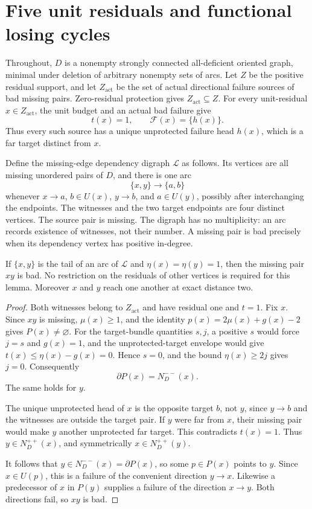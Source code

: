 \section{Five unit residuals and functional losing cycles}
\label{sec:five-unit-residuals}

Throughout, $D$ is a nonempty strongly connected all-deficient oriented
graph, minimal under deletion of arbitrary nonempty sets of arcs.
Let $Z$ be the positive residual support, and let $Z_{\mathrm{act}}$
be the set of actual directional
failure sources of bad missing pairs. Zero-residual protection gives
$Z_{\mathrm{act}}\subseteq Z$.
For every unit-residual $x\in Z_{\mathrm{act}}$, the unit budget and an actual bad
failure give
\[
 t(x)=1,\qquad\mathcal F(x)=\{h(x)\}.
\]
Thus every such source has a unique unprotected failure head $h(x)$,
which is a far target distinct from $x$.

Define the missing-edge dependency digraph $\mathcal L$ as follows.
Its vertices are all missing unordered pairs of $D$, and there is
one arc
\[
 \{x,y\}\longrightarrow\{a,b\}
\]
whenever $x\to a$, $b\in U(x)$, $y\to b$, and $a\in U(y)$,
possibly after interchanging the endpoints. The witnesses and the
two target endpoints are four distinct vertices. The source pair
is missing. The digraph has no multiplicity: an arc records existence
of witnesses, not their number. A missing pair is bad precisely when
its dependency vertex has positive in-degree.

\begin{lemma}
\label{lem:unit-cross-pairs-bad}
If $\{x,y\}$ is the tail of an arc of $\mathcal L$ and
$\eta(x)=\eta(y)=1$, then the missing pair $xy$ is bad.
No restriction on the residuals of other vertices is required for
this lemma. Moreover $x$ and $y$ reach one another at exact
distance two.
\end{lemma}

\begin{proof}
Both witnesses belong to $Z_{\mathrm{act}}$ and have residual one and
$t=1$. Fix $x$. Since $xy$ is missing, $\mu(x)\ge1$, and the identity
$p(x)=2\mu(x)+g(x)-2$ gives $P(x)\ne\varnothing$.
For the target-bundle quantities $s,j$, a positive $s$ would force
$j=s$ and $g(x)=1$, and the unprotected-target envelope would give
$t(x)\le\eta(x)-g(x)=0$. Hence $s=0$, and the bound
$\eta(x)\ge2j$ gives $j=0$. Consequently
\[
 \partial P(x)=N_D^{--}(x).
\]
The same holds for $y$.

The unique unprotected head of $x$ is the opposite target $b$, not
$y$, since $y\to b$ and the witnesses are outside the target pair.
If $y$ were far from $x$, their missing pair would make $y$ another
unprotected far target. This contradicts $t(x)=1$. Thus
$y\in N_D^{++}(x)$, and symmetrically $x\in N_D^{++}(y)$.

It follows that
$y\in N_D^{--}(x)=\partial P(x)$, so some $p\in P(x)$ points to $y$.
Since $x\in U(p)$, this is a failure of the convenient direction
$y\to x$. Likewise a predecessor of $x$ in $P(y)$ supplies a failure
of the direction $x\to y$. Both directions fail, so $xy$ is bad.
\end{proof}

